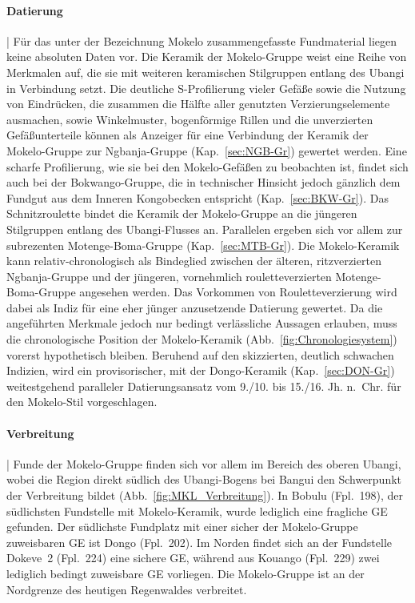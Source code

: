 \paragraph{Datierung}\hspace{-.5em}|\hspace{.5em}%
Für das unter der Bezeichnung Mokelo zusammengefasste Fundmaterial liegen keine absoluten Daten vor. Die Keramik der Mokelo-Gruppe weist eine Reihe von Merkmalen auf, die sie mit weiteren keramischen Stilgruppen entlang des \mbox{Ubangi} in Verbindung setzt. Die deutliche S-Profilierung vieler Gefäße sowie die Nutzung von Eindrücken, die zusammen die Hälfte aller genutzten Verzierungselemente ausmachen, sowie Winkelmuster, bogenförmige Rillen und die unverzierten Gefäßunterteile können als Anzeiger für eine Verbindung der Keramik der Mokelo-Gruppe zur \mbox{Ngbanja}-Gruppe (Kap.~\ref{sec:NGB-Gr}) gewertet werden. Eine scharfe Profilierung, wie sie bei den Mokelo-Gefäßen zu beobachten ist, findet sich auch bei der Bokwango-Gruppe, die in technischer Hinsicht jedoch gänzlich dem Fundgut aus dem Inneren Kongobecken entspricht (Kap.~\ref{sec:BKW-Gr}). Das Schnitzroulette bindet die Keramik der Mokelo-Gruppe an die jüngeren Stilgruppen entlang des \mbox{Ubangi}-Flusses an. Parallelen ergeben sich vor allem zur subrezenten Motenge-Boma-Gruppe (Kap.~\ref{sec:MTB-Gr}). Die Mokelo-Keramik kann relativ-chronologisch als Bindeglied zwischen der älteren, ritzverzierten \mbox{Ngbanja}-Gruppe und der jüngeren, vornehmlich rouletteverzierten Motenge-Boma-Gruppe angesehen werden. Das Vorkommen von Rouletteverzierung wird dabei als Indiz für eine eher jünger anzusetzende Datierung gewertet. Da die angeführten Merkmale jedoch nur bedingt verlässliche Aussagen erlauben, muss die chronologische Position der Mokelo-Keramik (Abb.~\ref{fig:Chronologiesystem}) vorerst hypothetisch bleiben. Beruhend auf den skizzierten, deutlich schwachen Indizien, wird ein provisorischer, mit der Dongo-Keramik (Kap.~\ref{sec:DON-Gr}) weitestgehend paralleler Datierungsansatz vom 9./10. bis 15./16. Jh. n.~Chr. für den Mokelo-Stil vorgeschlagen.


\paragraph{Verbreitung}\hspace{-.5em}|\hspace{.5em}%
Funde der Mokelo-Gruppe finden sich vor allem im Bereich des oberen \mbox{Ubangi}, wobei die Region direkt südlich des \mbox{Ubangi}-Bogens bei Bangui den Schwerpunkt der Verbreitung bildet (Abb.~\ref{fig:MKL_Verbreitung}). In Bobulu (Fpl.~198), der südlichsten Fundstelle mit Mokelo-Keramik, wurde lediglich eine fragliche GE gefunden. Der südlichste Fundplatz mit einer sicher der Mokelo-Gruppe zuweisbaren GE ist Dongo (Fpl.~202). Im Norden findet sich an der Fundstelle Dokeve~2 (Fpl.~224) eine sichere GE, während aus Kouango (Fpl.~229) zwei lediglich bedingt zuweisbare GE vorliegen. Die Mokelo-Gruppe ist an der Nordgrenze des heutigen Regenwaldes verbreitet.